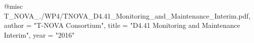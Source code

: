 @misc{ T_NOVA_./WP4/TNOVA_D4.41_Monitoring_and_Maintenance_Interim.pdf,
       author = "T-NOVA Consortium",
       title = "D4.41 Monitoring and Maintenance Interim",
       year = "2016" }
